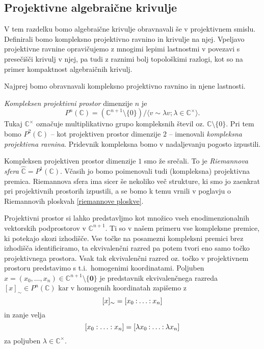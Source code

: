 \documentclass[mat1]{fmfdelo}
\newcommand{\C}{\mathbb C}
\newcommand{\CM}{\mathbb C ^\times}
\newcommand{\PC}{P^2(\mathbb C)}
\newcommand{\pcoor}[1]{%
  \begingroup\lccode`~=`: \lowercase{\endgroup
  \edef~}{\mathbin{\mathchar\the\mathcode`:}\nobreak}%
  [%
  \begingroup
  \mathcode`:=\string"8000
  #1%
  \endgroup
  ]%
}
\theoremstyle{definition}
\begin{document}
 

\subsection{Projektivne algebraične krivulje}

V tem razdelku bomo algebraične krivulje obravnavali še v projektivnem smislu. Definirali bomo kompleksno projektivno ravnino in krivulje na njej. Vpeljavo projektivne ravnine opravičujemo z mnogimi lepimi lastnostmi v povezavi s presečišči krivulj v njej, pa tudi z raznimi bolj topološkimi razlogi, kot so na primer kompaktnost algebraičnih krivulj.

Najprej bomo obravnavali kompleksno projektivno ravnino in njene lastnosti. 
\begin{definicija}
    \emph{Kompleksen projektivni prostor} dimenzije $n$ je 
    \[
        P^n(\C) = (\C^{n+1} \setminus \{0 \}) / \langle v \sim \lambda v; \lambda \in \C^{\times} \rangle.
    \]
    Tukaj $\C^{\times}$ označuje multiplikativno grupo kompleksnih števil oz. $\C \setminus \{0 \}$. 
    Pri tem bomo $\PC$ -- kot projektiven prostor dimenzije $2$ -- imenovali \emph{kompleksna projektivna ravnina}. Pridevnik kompleksna bomo v nadaljevanju pogosto izpustili.
\end{definicija}

\begin{primer*}
    Kompleksen projektiven prostor dimenzije $1$ smo že srečali. To je \emph{Riemannova sfera} $\widehat{\C} = P^1(\C)$. Včasih jo bomo poimenovali tudi (kompleksna) projektivna premica. Riemannova sfera ima sicer še nekoliko več strukture, ki smo jo zaenkrat pri projektivnih prostorih izpustili, a se bomo k temu vrnili v poglavju o Riemannovih ploskvah \ref{riemannove ploskve}.
\end{primer*}

Projektivni prostor si lahko predstavljmo kot množico vseh enodimenzionalnih vektorskih podprostorov v $\C^{n+1}$. Ti so v našem primeru vse kompleksne premice, ki potekajo skozi izhodišče. Vse točke na posamezni kompleksni premici brez izhodišča identificiramo, ta ekvivalenčni razred pa potem tvori eno samo točko projektivnega prostora. Vsak tak ekvivalenčni razred oz. točko v projektivnem prostoru predstavimo s t.i.\ homogenimi koordinatami. Poljuben $x = (x_0, \dots, x_n) \in \C^{n+1}\setminus \{\bm0\}$ je predstavnik ekvivalenčnega razreda $[x]_\sim \in P^n(\C)$ kar v homogenih koordinatah zapišemo z
    \[
        [x]_\sim = \pcoor{x_0 : \ldots : x_n}
    \]
in zanje velja
    \[
        [x_0: \ldots: x_n] = \pcoor{\lambda x_0: \ldots: \lambda x_n}
    \]
za poljuben $\lambda \in \CM$.
\end{document}
